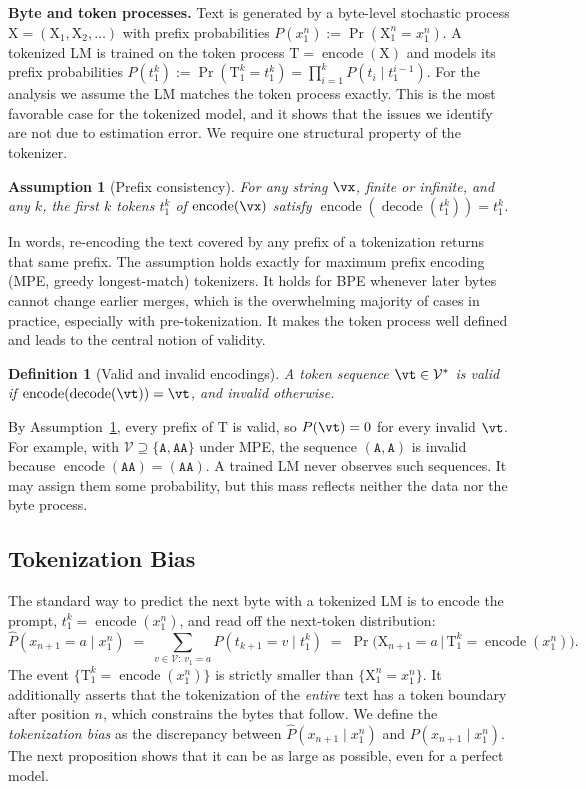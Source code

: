 \documentclass{article} %
\newtheorem{definition}{Definition}
\newtheorem{assumption}{Assumption}
\newcommand{\enc}{\operatorname{encode}}
\newcommand{\dec}{\operatorname{decode}}
\newcommand{\vocab}{\mathcal{V}}
\newcommand{\tok}[1]{\texttt{#1}}
\providecommand{\rX}{\mathrm{X}}
\providecommand{\rT}{\mathrm{T}}
\begin{document}
\textbf{Byte and token processes.}
Text is generated by a byte-level stochastic process $\rX = (\rX_1, \rX_2, \dots)$ with prefix probabilities $P(x_1^n) := \Pr(\rX_1^n = x_1^n)$. A tokenized LM is trained on the token process $\rT = \enc(\rX)$ and models its prefix probabilities $P(t_1^k) := \Pr(\rT_1^k = t_1^k) = \prod_{i=1}^k P(t_i \mid t_1^{i-1})$. For the analysis we assume the LM matches the token process exactly. This is the most favorable case for the tokenized model, and it shows that the issues we identify are not due to estimation error. We require one structural property of the tokenizer.

\begin{assumption}[Prefix consistency]
\label{ass:prefix}
For any string $\vx$, finite or infinite, and any $k$, the first $k$ tokens $t_1^k$ of $\enc(\vx)$ satisfy $\enc(\dec(t_1^k)) = t_1^k$.
\end{assumption}

In words, re-encoding the text covered by any prefix of a tokenization returns that same prefix. The assumption holds exactly for maximum prefix encoding (MPE, greedy longest-match) tokenizers. It holds for BPE whenever later bytes cannot change earlier merges, which is the overwhelming majority of cases in practice, especially with pre-tokenization. It makes the token process well defined and leads to the central notion of validity.

\begin{definition}[Valid and invalid encodings]
\label{def:valid}
A token sequence $\vt \in \vocab^*$ is \emph{valid} if $\enc(\dec(\vt)) = \vt$, and \emph{invalid} otherwise.
\end{definition}

By Assumption~\ref{ass:prefix}, every prefix of $\rT$ is valid, so $P(\vt) = 0$ for every invalid $\vt$. For example, with $\vocab \supseteq \{\tok{A}, \tok{AA}\}$ under MPE, the sequence $(\tok{A}, \tok{A})$ is invalid because $\enc(\tok{AA}) = (\tok{AA})$. A trained LM never observes such sequences. It may assign them some probability, but this mass reflects neither the data nor the byte process.

\subsection{Tokenization Bias}
\label{sec:bias}
The standard way to predict the next byte with a tokenized LM is to encode the prompt, $t_1^k = \enc(x_1^n)$, and read off the next-token distribution:
\begin{equation}
\hat P(x_{n+1}=a \mid x_1^n) \;=\; \sum_{v \in \vocab:\, v_1 = a} P(t_{k+1} = v \mid t_1^k)
\;=\; \Pr\!\big(\rX_{n+1} = a \,\big|\, \rT_1^k = \enc(x_1^n)\big).
\label{eq:naive}
\end{equation}
The event $\{\rT_1^k = \enc(x_1^n)\}$ is strictly smaller than $\{\rX_1^n = x_1^n\}$. It additionally asserts that the tokenization of the \emph{entire} text has a token boundary after position $n$, which constrains the bytes that follow. We define the \emph{tokenization bias} as the discrepancy between $\hat P(x_{n+1}\mid x_1^n)$ and $P(x_{n+1}\mid x_1^n)$. The next proposition shows that it can be as large as possible, even for a perfect model.
\end{document}
